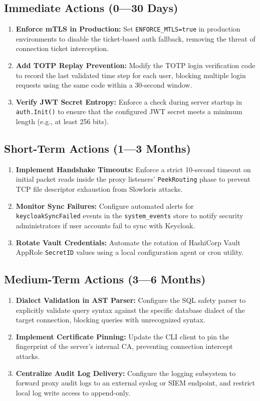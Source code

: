 \subsection{Immediate Actions (0---30 Days)}
\begin{enumerate}[leftmargin=*]
    \item \textbf{Enforce mTLS in Production:} Set \texttt{ENFORCE\_MTLS=true} in production environments to disable the ticket-based auth fallback, removing the threat of connection ticket interception.
    \item \textbf{Add TOTP Replay Prevention:} Modify the TOTP login verification code to record the last validated time step for each user, blocking multiple login requests using the same code within a 30-second window.
    \item \textbf{Verify JWT Secret Entropy:} Enforce a check during server startup in \texttt{auth.Init()} to ensure that the configured JWT secret meets a minimum length (e.g., at least 256 bits).
\end{enumerate}

\subsection{Short-Term Actions (1---3 Months)}
\begin{enumerate}[leftmargin=*]
    \item \textbf{Implement Handshake Timeouts:} Enforce a strict 10-second timeout on initial packet reads inside the proxy listeners' \texttt{PeekRouting} phase to prevent TCP file descriptor exhaustion from Slowloris attacks.
    \item \textbf{Monitor Sync Failures:} Configure automated alerts for \texttt{keycloakSyncFailed} events in the \texttt{system\_events} store to notify security administrators if user accounts fail to sync with Keycloak.
    \item \textbf{Rotate Vault Credentials:} Automate the rotation of HashiCorp Vault AppRole \texttt{SecretID} values using a local configuration agent or cron utility.
\end{enumerate}

\subsection{Medium-Term Actions (3---6 Months)}
\begin{enumerate}[leftmargin=*]
    \item \textbf{Dialect Validation in AST Parser:} Configure the SQL safety parser to explicitly validate query syntax against the specific database dialect of the target connection, blocking queries with unrecognized syntax.
    \item \textbf{Implement Certificate Pinning:} Update the CLI client to pin the fingerprint of the server's internal CA, preventing connection intercept attacks.
    \item \textbf{Centralize Audit Log Delivery:} Configure the logging subsystem to forward proxy audit logs to an external syslog or SIEM endpoint, and restrict local log write access to append-only.
\end{enumerate}

